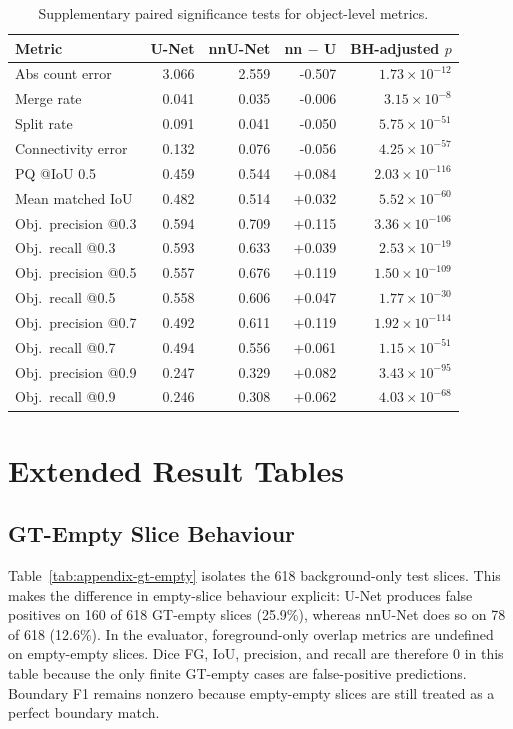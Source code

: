 \documentclass[logo,bsc,singlespacing,parskip,online]{infthesis}
\begin{document}
\begin{table}[H]
\centering
\small
\caption{Supplementary paired significance tests for object-level metrics.}
\label{tab:appendix-stats-object}
\begin{tabular}{lrrrr}
\toprule
\textbf{Metric} & \textbf{U-Net} & \textbf{nnU-Net} & \textbf{nn $-$ U} & \textbf{BH-adjusted $p$} \\
\midrule
Abs count error & 3.066 & 2.559 & -0.507 & $1.73\times 10^{-12}$ \\
Merge rate & 0.041 & 0.035 & -0.006 & $3.15\times 10^{-8}$ \\
Split rate & 0.091 & 0.041 & -0.050 & $5.75\times 10^{-51}$ \\
Connectivity error & 0.132 & 0.076 & -0.056 & $4.25\times 10^{-57}$ \\
PQ @IoU 0.5 & 0.459 & 0.544 & +0.084 & $2.03\times 10^{-116}$ \\
Mean matched IoU & 0.482 & 0.514 & +0.032 & $5.52\times 10^{-60}$ \\
Obj.\ precision @0.3 & 0.594 & 0.709 & +0.115 & $3.36\times 10^{-106}$ \\
Obj.\ recall @0.3 & 0.593 & 0.633 & +0.039 & $2.53\times 10^{-19}$ \\
Obj.\ precision @0.5 & 0.557 & 0.676 & +0.119 & $1.50\times 10^{-109}$ \\
Obj.\ recall @0.5 & 0.558 & 0.606 & +0.047 & $1.77\times 10^{-30}$ \\
Obj.\ precision @0.7 & 0.492 & 0.611 & +0.119 & $1.92\times 10^{-114}$ \\
Obj.\ recall @0.7 & 0.494 & 0.556 & +0.061 & $1.15\times 10^{-51}$ \\
Obj.\ precision @0.9 & 0.247 & 0.329 & +0.082 & $3.43\times 10^{-95}$ \\
Obj.\ recall @0.9 & 0.246 & 0.308 & +0.062 & $4.03\times 10^{-68}$ \\
\bottomrule
\end{tabular}
\end{table}

\section{Extended Result Tables}

\subsection{GT-Empty Slice Behaviour}

Table~\ref{tab:appendix-gt-empty} isolates the 618 background-only test slices.
This makes the difference in empty-slice behaviour explicit: U-Net produces
false positives on 160 of 618 GT-empty slices (25.9\%), whereas nnU-Net does so
on 78 of 618 (12.6\%).
In the evaluator, foreground-only overlap metrics are undefined on
empty-empty slices. Dice FG, IoU, precision, and recall are therefore 0 in
this table because the only finite GT-empty cases are false-positive
predictions. Boundary F1 remains nonzero because empty-empty slices are still
treated as a perfect boundary match.
\end{document}
